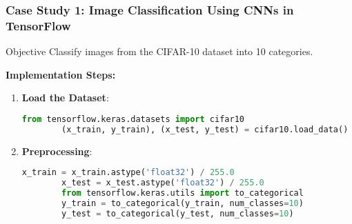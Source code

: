 \documentclass[aspectratio=169]{beamer}
\begin{document}
\begin{frame}[fragile]
    \frametitle{Case Study 1: Image Classification Using CNNs in TensorFlow}
    \begin{block}{Objective}
        Classify images from the CIFAR-10 dataset into 10 categories.
    \end{block}
    
    \textbf{Implementation Steps:}
    \begin{enumerate}
        \item \textbf{Load the Dataset}:
        \begin{lstlisting}[language=Python]
        from tensorflow.keras.datasets import cifar10
        (x_train, y_train), (x_test, y_test) = cifar10.load_data()
        \end{lstlisting}
        
        \item \textbf{Preprocessing}:
        \begin{lstlisting}[language=Python]
        x_train = x_train.astype('float32') / 255.0
        x_test = x_test.astype('float32') / 255.0
        from tensorflow.keras.utils import to_categorical
        y_train = to_categorical(y_train, num_classes=10)
        y_test = to_categorical(y_test, num_classes=10)
        \end{lstlisting}
    \end{enumerate}
\end{frame}
\end{document}

